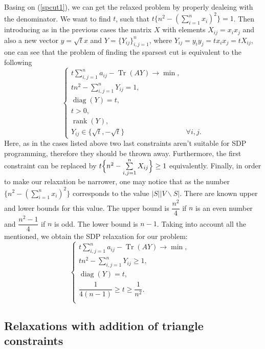 \documentclass[12pt]{article}
\DeclareMathOperator{\trace}{Tr}
\DeclareMathOperator{\diag}{diag}
\DeclareMathOperator{\rank}{rank}
\begin{document}
Basing on (\ref{spcut1}), we can get the relaxed problem by properly dealeing with the denominator. We want to find $t$, such that $t\Biggl\{ n^2 - \left( \sum\limits_{i=1}^n x_i \right)^2\Biggr\} = 1$. Then introducing as in the previous cases the matrix $X$ with elements $X_{ij} = x_i x_j$ and also a new vector $y = \sqrt{t} x$ and $Y = \{Y_{ij}\}_{i,j = 1}^n$, where $Y_{ij} = y_iy_j = tx_ix_j = tX_{ij}$, one can see that the problem of finding the sparsest cut is equivalent to the following
\[
\begin{cases}
   t \sum\limits_{i,j=1}^n a_{ij} -  \trace(AY) \longrightarrow \min, &\\
   t n^2 - \sum\limits_{i,j=1}^n Y_{ij}  = 1, &\\
   \diag(Y) = t, & \\
   t > 0, &\\
   \rank(Y), &\\
   Y_{ij} \in \{\sqrt{t}, -\sqrt{t}\} & \forall i,j.
\end{cases}
\]
Here, as in the cases listed above two last constraints aren't suitable for SDP programming, therefore they should be thrown away. Furthermore, the first constraint can be replaced by $t\Bigl\{ n^2 - \sum\limits_{i,j=1}^n X_{ij} \Bigr\} \geq 1$ equivalently. Finally, in order to make our relaxation be narrower, one may notice that as the number $\Biggl\{ n^2 - \left( \sum\limits_{i=1}^n x_i \right)^2\Biggr\}$ corresponds to the value $|S||V\backslash S|$. There are known upper and lower bounds for this value. The upper bound is $\dfrac{n^2}4$ if $n$ is an even number and $\dfrac{n^2-1}4$ if $n$ is odd. The lower bound is $n-1$. Taking into account all the mentioned, we obtain the SDP relaxation for our problem:
\begin{equation}
    \label{spcut_rel}
    \begin{cases}
       t \sum\limits_{i,j=1}^n a_{ij} -  \trace(AY) \longrightarrow \min, &\\
   t n^2 - \sum\limits_{i,j=1}^n Y_{ij} \geq 1, \\
   \diag(Y) = t,  \\
    \dfrac1{4(n-1)} \geq t \geq \dfrac1{n^2}. \\
    \end{cases}
\end{equation}


\subsection{Relaxations with addition of triangle constraints}
\end{document}
